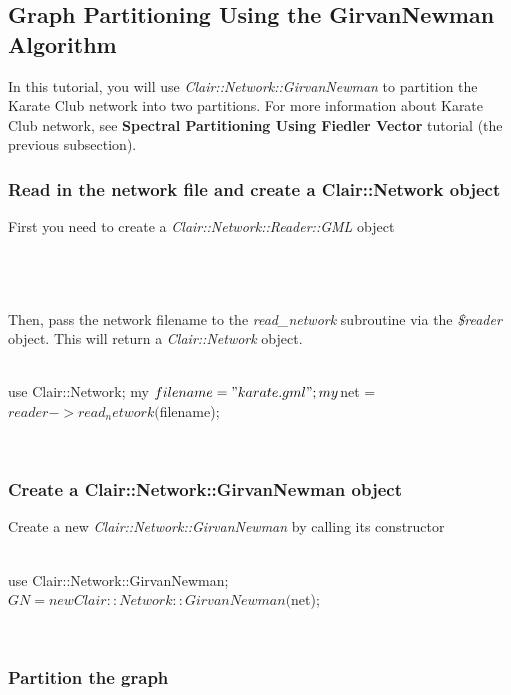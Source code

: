 \subsection{Graph Partitioning Using the GirvanNewman Algorithm}

In this tutorial, you will use \emph{Clair::Network::GirvanNewman} to partition the Karate Club network into two partitions. For more information about Karate Club network, see \textbf{Spectral Partitioning Using Fiedler Vector} tutorial (the previous subsection).

\subsubsection{Read in the network file and create a Clair::Network object}

First you need to create a \emph{Clair::Network::Reader::GML} object
\\
\\
\\
\\
Then, pass the network filename to the \emph{read\_network} subroutine via the \emph{\$reader} object. This will return a \emph{Clair::Network} object.
\\
\\
\begin{boxedverbatim}
 use Clair::Network;
 my $filename = "karate.gml";
 my $net = $reader->read_network($filename);
\end{boxedverbatim}
\\
\subsubsection{Create a Clair::Network::GirvanNewman object}

Create a new \emph{Clair::Network::GirvanNewman} by calling its constructor
\\
\\
\begin{boxedverbatim}
 use Clair::Network::GirvanNewman;
 $GN = new Clair::Network::GirvanNewman($net);
\end{boxedverbatim}
\\
\subsubsection{Partition the graph}

